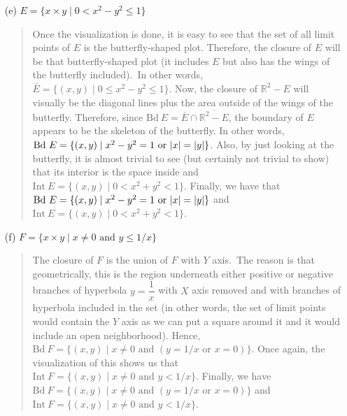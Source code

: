 \documentclass[12pt, a4paper]{article}
\newcommand{\reals}{\mathbb{R}} %
\DeclarePairedDelimiter\abs{\lvert}{\rvert}
\begin{document}
\begin{itemize}
\begin{itemize}
\item[(e)]
$E = \{x \times y \mid 0 < x^2 - y^2 \leq 1\}$
\begin{quote}
Once the visualization is done, it is easy to see that the set
of all limit points of $E$ is the butterfly-shaped plot. Therefore,
the closure of $E$ will be that butterfly-shaped plot (it includes $E$
but also has the wings of the butterfly included).\ In other words,
$\bar{E} = \{(x, y) \mid 0 \leq x^2 - y^2 \leq 1\}$. Now, the closure
of $\reals^2 - E$ will visually be the diagonal lines plus the area outside
of the wings of the butterfly. Therefore, since $\mbox{Bd} \ E = \bar{E} \cap \overline{\reals^2 - E}$,
the boundary of $E$ appears to be the skeleton of the butterfly. In other words, $\mbox{Bd} \ E = \{(x, y) \mid x^2 - y^2 = 1 \mbox{ or } \abs{x} = \abs{y}\}$.
Also, by just looking at the butterfly, it is almost trivial to see (but certainly not trivial to show)
that its interior is the space inside and $\mbox{Int} \ E = \{(x, y) \mid 0 < x^2 + y^2 < 1\}$.
Finally, we have that $\mbox{Bd} \ E = \{(x, y) \mid x^2 - y^2 = 1 \mbox{ or } \abs{x} = \abs{y}\}$ and $\mbox{Int} \ E = \{(x, y) \mid 0 < x^2 + y^2 < 1\}$.
\end{quote}

\item[]
\item[]

\item[(f)]
$F = \{x \times y \mid x \neq 0 \mbox{ and } y \leq 1/x\}$
\begin{quote}
The closure of $F$ is the union
of $F$ with $Y$ axis.\ The reason is that geometrically,
this is the region underneath either positive
or negative branches of hyperbola $y = \dfrac{1}{x}$
with $X$ axis removed and with branches of hyperbola included
in the set (in other words, the set of limit points would contain
the $Y$ axis as we can put a square around it and it would include
an open neighborhood). Hence, $\mbox{Bd} \ F = \{(x, y) \mid x \neq 0 \mbox{ and } (y = 1/x \mbox{ or } x = 0)\}$.
Once again, the visualization of this shows us that $\mbox{Int} \ F = \{(x, y) \mid x \neq 0 \mbox{ and } y < 1/x\}$.
Finally, we have $\mbox{Bd} \ F = \{(x, y) \mid x \neq 0 \mbox{ and } (y = 1/x \mbox{ or } x = 0)\}$ and $\mbox{Int} \ F = \{(x, y) \mid x \neq 0 \mbox{ and } y < 1/x\}$.
\end{quote}
\end{itemize}
\end{itemize}
\end{document}

